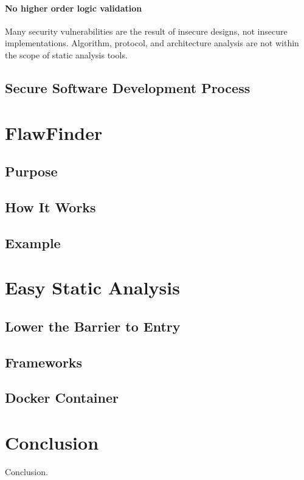 \documentclass[journal]{IEEEtran}
\begin{document}
\paragraph{No higher order logic validation} Many security vulnerabilities are the result of
insecure designs, not insecure implementations. Algorithm, protocol, and architecture analysis are
not within the scope of static analysis tools.

\subsection{Secure Software Development Process}


\section{FlawFinder}

\subsection{Purpose}

\subsection{How It Works}

\subsection{Example}


\section{Easy Static Analysis}

\subsection{Lower the Barrier to Entry}

\subsection{Frameworks}

\subsection{Docker Container}


\section{Conclusion}
Conclusion.
\end{document}
